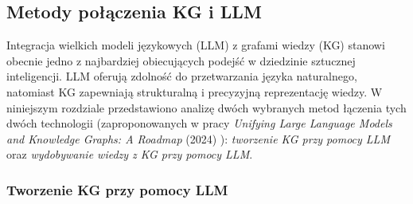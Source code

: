 \documentclass[
a4paper,
12pt,
]{article}
\begin{document}
\subsection{Metody połączenia KG i LLM}

Integracja wielkich modeli językowych (LLM) z grafami wiedzy (KG) stanowi obecnie jedno z najbardziej obiecujących podejść w dziedzinie sztucznej inteligencji. LLM oferują zdolność do przetwarzania języka naturalnego, natomiast KG zapewniają strukturalną i precyzyjną 
reprezentację wiedzy. W niniejszym rozdziale przedstawiono analizę dwóch wybranych metod łączenia tych dwóch technologii (zaproponowanych w pracy \textit{Unifying Large Language Models and Knowledge Graphs: A Roadmap} (2024) \cite{graph:llm:roadmap}): \textit{tworzenie KG przy pomocy LLM} oraz \textit{wydobywanie wiedzy z KG przy pomocy LLM}. 

\subsubsection{Tworzenie KG przy pomocy LLM} %
\label{kgllm:construction}
\end{document}
